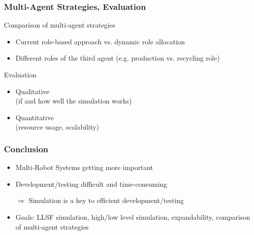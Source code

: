 \documentclass[]{beamer}
\begin{document}
\begin{frame}
\frametitle{Multi-Agent Strategies, Evaluation}
Comparison of multi-agent strategies
\begin{itemize}
\item Current role-based approach vs. dynamic role allocation
\item Different roles of the third agent (e.g. production vs. recycling role)
\end{itemize}
\pause
Evaluation
\begin{itemize}
\item Qualitative\\(if and how well the simulation works)
\item Quantitative\\(resource usage, scalability)
\end{itemize}
\end{frame}

\begin{frame}
\frametitle{Conclusion}
\begin{itemize}
\item Multi-Robot Systems getting more important
\item Development/testing difficult and time-consuming
\item[$\Rightarrow$] Simulation is a key to efficient development/testing
\pause
\item Goals: LLSF simulation, high/low level simulation, expandability, comparison of multi-agent strategies
\pause
\end{itemize}
\end{frame}
\end{document}
